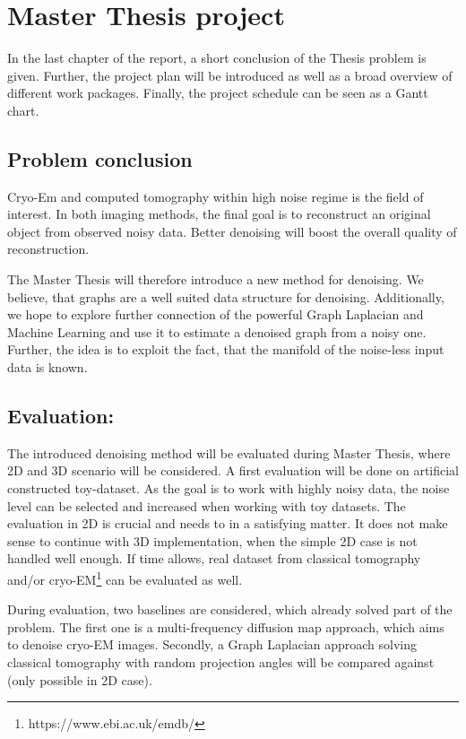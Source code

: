 \chapter{Master Thesis project}
\label{sec:projectOverview}
In the last chapter of the report, a short conclusion of the Thesis problem is given.
Further, the project plan will be introduced as well as a broad overview of different 
work packages. Finally, the project schedule can be seen as a Gantt chart.

\section{Problem conclusion}

Cryo-Em and computed tomography within high noise regime is the field of interest.
In both imaging methods, the final goal is to reconstruct an original object from observed noisy data. 
Better denoising will boost the overall quality of reconstruction. 

The Master Thesis will therefore introduce a new method for denoising. 
We believe, that graphs are a well suited data structure for denoising.
Additionally, we hope to explore further connection of the powerful Graph Laplacian
and Machine Learning and use it to estimate a denoised graph from a noisy one.
Further, the idea is to exploit the fact, that the manifold of the 
noise-less input data is known.

\section{Evaluation:}
The introduced denoising method will be evaluated during Master Thesis, where 2D and 3D scenario will be considered.
A first evaluation will be done on artificial constructed toy-dataset.
As the goal is to work with highly noisy data,
the noise level can be selected and increased when working with toy datasets. 
The evaluation in 2D is crucial and needs to in a satisfying matter. 
It does not make sense to continue with 3D implementation, when the simple 2D case is not handled well enough.
If time allows, real dataset from classical tomography and/or cryo-EM\footnote{https://www.ebi.ac.uk/emdb/} can be evaluated as well.

During evaluation, two baselines are considered, which already solved part of the problem. 
The first one is a multi-frequency diffusion map approach\cite{multiDiffusionMaps, cryoEmMutliDM}, which aims to denoise cryo-EM images. 
Secondly, \cite{LaplaceRandomProjections} a Graph Laplacian approach solving classical tomography with random projection angles will be compared against
(only possible in 2D case).

